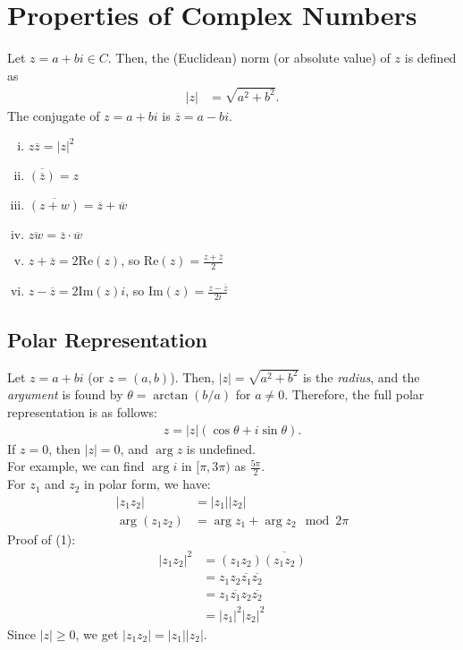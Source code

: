 \documentclass[10pt]{extarticle}
\begin{document}
  \section{Properties of Complex Numbers}%
  Let $z = a+bi\in C$. Then, the (Euclidean) norm (or absolute value) of $z$ is defined as
  \begin{align*}
    |z| &= \sqrt{a^2 + b^2}.
  \end{align*}
  The conjugate of $z = a+bi$ is $\overline{z} = a-bi$.
  \begin{enumerate}[(i)]
    \item $z\overline{z} = |z|^2$
    \item $\overline{(\overline{z})}=z$
    \item $\overline{(z+w)} = \overline{z} + \overline{w}$
    \item $\overline{zw} = \overline{z}\cdot\overline{w}$
    \item $z + \overline{z} = 2\text{Re}(z)$, so $\text{Re}(z) = \frac{z + \overline{z}}{2}$
    \item $z - \overline{z} = 2\text{Im}(z)i$, so $\text{Im}(z) = \frac{z-\overline{z}}{2i}$
  \end{enumerate}
  \subsection{Polar Representation}%
  Let $z = a+bi$ (or $z = (a,b)$). Then, $|z| = \sqrt{a^2 + b^2}$ is the \textit{radius}, and the \textit{argument} is found by $\theta = \arctan(b/a)$ for $a\neq 0$. Therefore, the full polar representation is as follows:
  \begin{align*}
    z = |z|\left(\cos\theta + i\sin\theta\right) \tag*{$\theta \in [0,2\pi)$}.
  \end{align*}
  If $z = 0$, then $|z| = 0$, and $\arg z$ is undefined.\\

  For example, we can find $\arg i$ in $[\pi,3\pi)$ as $\frac{5\pi}{2}$.\\

  For $z_1$ and $z_2$ in polar form, we have:
  \begin{align*}
    |z_1z_2| &= |z_1||z_2| \tag*{(1)}\\
    \arg(z_1z_2) &= \arg z_1 + \arg z_2 \mod 2\pi \tag*{(2)}
  \end{align*}
  Proof of (1):
  \begin{align*}
    |z_1z_2|^2 &= (z_1z_2)\overline{(z_1z_2)}\\
               &= z_1z_2\overline{z_1}\overline{z_2}\\
               &= z_1\overline{z_1}z_2\overline{z_2}\\
               &= |z_1|^2|z_2|^2
  \end{align*}
  Since $|z|\geq 0$, we get $|z_1z_2| = |z_1||z_2|$.\\
\end{document}
